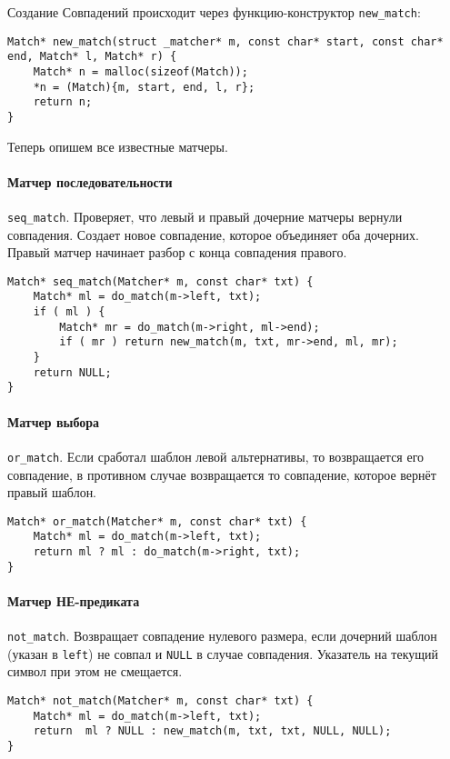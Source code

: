 \documentclass[10pt]{report}
\begin{document}
Создание Совпадений происходит через функцию-конструктор {\tt new\_match}:
\begin{lstlisting}[firstnumber=35]
Match* new_match(struct _matcher* m, const char* start, const char* end, Match* l, Match* r) {
	Match* n = malloc(sizeof(Match));
	*n = (Match){m, start, end, l, r};
	return n;
}
\end{lstlisting}

Теперь опишем все известные матчеры.
\paragraph{Матчер последовательности} {\tt seq\_match}. Проверяет, что левый и правый дочерние матчеры вернули совпадения.
Создает новое совпадение, которое объединяет оба дочерних. Правый матчер начинает разбор с конца совпадения правого.
\begin{lstlisting}[firstnumber=74]
Match* seq_match(Matcher* m, const char* txt) {
	Match* ml = do_match(m->left, txt);
	if ( ml ) {
		Match* mr = do_match(m->right, ml->end);
		if ( mr ) return new_match(m, txt, mr->end, ml, mr);
	} 
	return NULL;
}
\end{lstlisting}

\paragraph{Матчер выбора} {\tt or\_match}. Если сработал шаблон левой альтернативы, то возвращается его совпадение, в противном случае возвращается то совпадение, которое вернёт правый шаблон.
\begin{lstlisting}[firstnumber=83]
Match* or_match(Matcher* m, const char* txt) {
	Match* ml = do_match(m->left, txt);
	return ml ? ml : do_match(m->right, txt);
}
\end{lstlisting}

\paragraph{Матчер НЕ-предиката} {\tt not\_match}. Возвращает совпадение нулевого размера, если дочерний шаблон (указан в {\tt left}) не совпал и {\tt NULL} в случае совпадения. Указатель на текущий символ при этом не смещается.
\begin{lstlisting}[firstnumber=88]
Match* not_match(Matcher* m, const char* txt) {
	Match* ml = do_match(m->left, txt);
	return  ml ? NULL : new_match(m, txt, txt, NULL, NULL);
}
\end{lstlisting}
\end{document}
